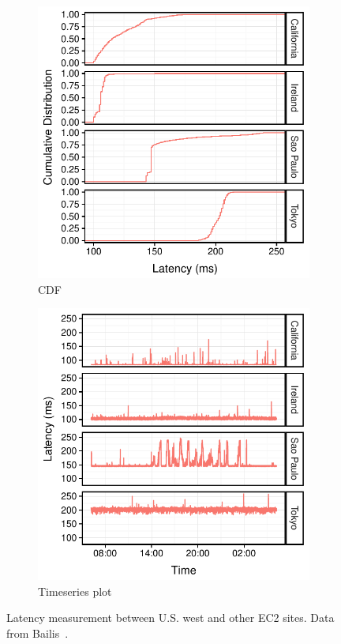 \begin{figure}
  \centering
  \begin{subfigure}{.48\columnwidth}
    \centering
    \includegraphics[width=.95\linewidth]{figures/latency-cdf.pdf}
    \caption{CDF}
    \label{fig:bar}
  \end{subfigure}
  \begin{subfigure}{.48\columnwidth}
    \centering
    \includegraphics[width=.95\linewidth]{figures/latency-ts.pdf}
    \caption{Timeseries plot}
    \label{fig:ts}
  \end{subfigure}
  \caption{Latency measurement between U.S. west and other EC2 sites. Data from Bailis~\cite{bailis2013highly}.}
  \label{fig:bw}
\end{figure}

